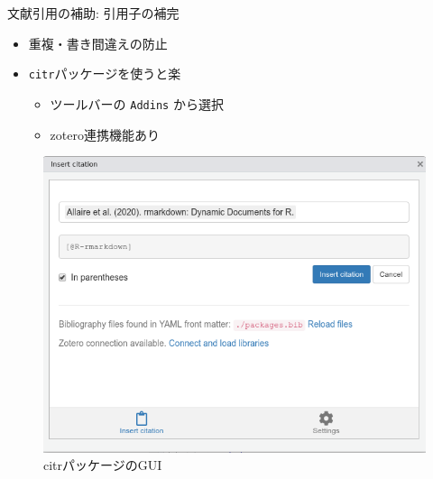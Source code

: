 \documentclass[
  12pt,
  ignorenonframetext,
]{beamer}
\providecommand{\tightlist}{%
  \setlength{\itemsep}{0pt}\setlength{\parskip}{0pt}}
\begin{document}
\begin{frame}[fragile]{文献引用の補助: 引用子の補完}
\protect\hypertarget{ux6587ux732eux5f15ux7528ux306eux88dcux52a9-ux5f15ux7528ux5b50ux306eux88dcux5b8c}{}

\begin{itemize}
\tightlist
\item
  重複・書き間違えの防止
\item
  \texttt{citr}パッケージを使うと楽

  \begin{itemize}
  \tightlist
  \item
    ツールバーの \texttt{Addins} から選択
  \item
    zotero連携機能あり
  \end{itemize}
\end{itemize}

\begin{figure}

{\centering \includegraphics[width=0.5\linewidth]{img/citr} 

}

\caption{citrパッケージのGUI}\label{fig:citr-image}
\end{figure}

\end{frame}
\end{document}
